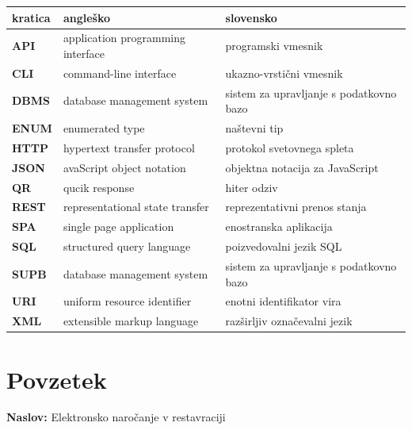 \documentclass[a4paper, 12pt]{book}
\newcommand{\ttitle}{Elektronsko naročanje v restavraciji}
\newcommand{\clearemptydoublepage}{\newpage{\pagestyle{empty}\cleardoublepage}}
\begin{document}
\noindent\begin{tabular}{p{}|p{}|p{}}    %
  {\bf kratica} & {\bf angleško}                             & {\bf slovensko} \\ \hline
  {\bf API}   &  application programming interface              & programski vmesnik\\
  {\bf CLI}   & command-line interface              & ukazno-vrstični vmesnik \\
  {\bf DBMS}   &  database management system              & sistem za upravljanje s podatkovno bazo \\
  {\bf ENUM}   & enumerated type              & naštevni tip \\
  {\bf HTTP}   &  hypertext transfer protocol               &  protokol svetovnega spleta \\
  {\bf JSON}   &  avaScript object notation               &  objektna notacija za JavaScript \\
  {\bf QR}   &  qucik  response              & hiter odziv\\
  {\bf REST}   & representational state transfer              & reprezentativni prenos stanja \\
  {\bf SPA}      & single page application               &  enostranska aplikacija \\	
  {\bf SQL} & structured query language & poizvedovalni jezik SQL  \\
  {\bf SUPB}      & database management system &  sistem za upravljanje s podatkovno bazo \\	
  {\bf URI}   &  uniform resource identifier              & enotni identifikator vira \\
  {\bf XML}   &  extensible markup language              & razširljiv označevalni jezik \\

\end{tabular}


\clearemptydoublepage

\chapter*{Povzetek}

\noindent\textbf{Naslov:} \ttitle
\bigskip
\end{document}
